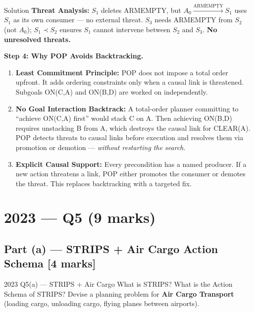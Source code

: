 \documentclass[12pt,a4paper]{article}
\begin{document}
\begin{solbox}{Solution}
\textbf{Threat Analysis:} $S_1$ deletes ARMEMPTY, but $A_0 \xrightarrow{\text{ARMEMPTY}} S_1$
uses $S_1$ as its own consumer --- no external threat.
$S_3$ needs ARMEMPTY from $S_2$ (not $A_0$); $S_1 \prec S_2$ ensures $S_1$
cannot intervene between $S_2$ and $S_3$. \textbf{No unresolved threats.}

\bigskip
\textbf{Step 4: Why POP Avoids Backtracking.}
\begin{enumerate}[noitemsep]
  \item \textbf{Least Commitment Principle:} POP does not impose a total order upfront.
    It adds ordering constraints only when a causal link is threatened.
    Subgoals ON(C,A) and ON(B,D) are worked on independently.
  \item \textbf{No Goal Interaction Backtrack:} A total-order planner committing to
    ``achieve ON(C,A) first'' would stack C on A. Then achieving ON(B,D)
    requires unstacking B from A, which destroys the causal link for CLEAR(A).
    POP detects threats to causal links before execution and resolves them
    via promotion or demotion --- \emph{without restarting the search}.
  \item \textbf{Explicit Causal Support:} Every precondition has a named producer.
    If a new action threatens a link, POP either promotes the consumer or
    demotes the threat. This replaces backtracking with a targeted fix.
\end{enumerate}
\end{solbox}

\newpage

\section{2023 --- Q5 (9 marks)}

\subsection{Part (a) --- STRIPS + Air Cargo Action Schema [4 marks]}

\begin{qbox}{2023 Q5(a) --- STRIPS + Air Cargo}
What is STRIPS? What is the Action Schema of STRIPS?
Devise a planning problem for \textbf{Air Cargo Transport}
(loading cargo, unloading cargo, flying planes between airports).
\end{qbox}
\end{document}
